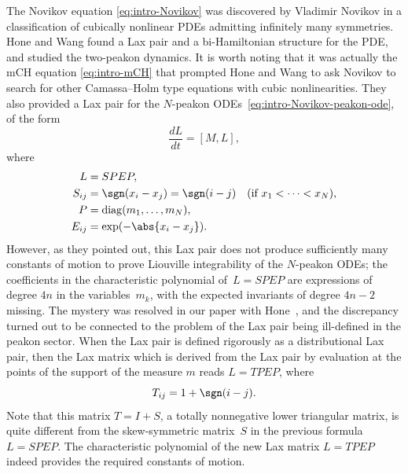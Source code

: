 \documentclass[10pt,a4paper]{article} \pdfoutput=1 
\begin{document}
The Novikov equation \eqref{eq:intro-Novikov} was discovered by Vladimir Novikov \cite{novikov:2009:generalizations-of-CH}
in a classification of cubically nonlinear PDEs admitting infinitely many symmetries.
Hone and Wang \cite{hone-wang:2008:cubic-nonlinearity} found a Lax pair
and a bi-Hamiltonian structure for the PDE,
and studied the two-peakon dynamics.
It is worth noting \cite[p.~3]{hone-wang:2008:cubic-nonlinearity}
that it was actually the mCH equation \eqref{eq:intro-mCH}
that prompted Hone and Wang to ask Novikov to search for other Camassa--Holm type equations
with cubic nonlinearities.
They also provided a Lax pair for the $N$-peakon ODEs~\eqref{eq:intro-Novikov-peakon-ode},
of the form
\begin{equation*}
  \frac{dL}{dt} = [M, L]
  ,
\end{equation*}
where
\begin{equation*}
  \begin{aligned}
    L &= SPEP
    ,\\
    S_{ij} & = \sgn(x_i-x_j)
    = \sgn(i-j)
    \quad\text{(if $x_1 < \dots < x_N$)}
    ,\\
    P &= \operatorname{diag}(m_1,\dots, m_N)
    ,\\
    E_{ij} &= \exp(-\abs{x_i-x_j})
    .
  \end{aligned}
\end{equation*}
However, as they pointed out, this Lax pair does not produce sufficiently many constants of motion
to prove Liouville integrability of the $N$-peakon ODEs;
the coefficients in the characteristic polynomial of~$L = SPEP$
are expressions of degree $4n$ in the variables~$m_k$,
with the expected invariants of degree $4n-2$ missing.
The mystery was resolved in our paper with Hone~\cite{hone-lundmark-szmigielski:2009:novikov},
and the discrepancy turned out to be connected to the problem of the Lax pair being ill-defined
in the peakon sector.
When the Lax pair is defined rigorously as a distributional Lax pair, then the Lax matrix
which is derived from the Lax pair by evaluation at the points of the support of the measure $m$
reads $L = TPEP$, where
\begin{equation}
  \label{eq:guide-matrix-T}
  T_{ij} = 1 + \sgn(i-j)
  .
\end{equation}
Note that this matrix $T = I+S$, a totally nonnegative lower triangular matrix,
is quite different from the skew-symmetric matrix~$S$ in the previous formula $L=SPEP$.
The characteristic polynomial of the new Lax matrix $L = TPEP$
indeed provides the required constants of motion.
\end{document}
